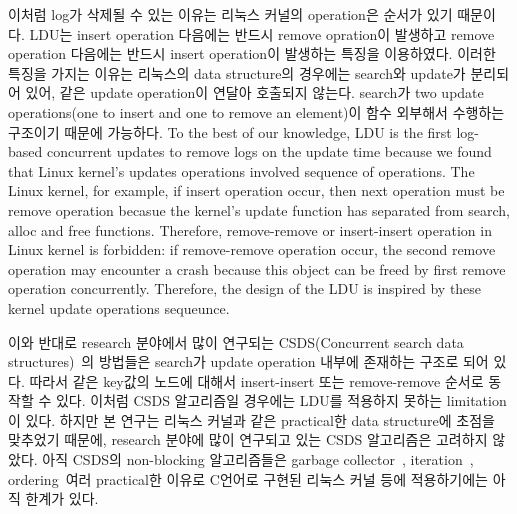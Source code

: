 \ifkor
이처럼 log가 삭제될 수 있는 이유는 리눅스 커널의 operation은 순서가
있기 때문이다.
LDU는 insert operation 다음에는 반드시 remove opration이 발생하고 remove operation 다음에는 반드시
insert operation이 발생하는 특징을 이용하였다.
이러한 특징을 가지는 이유는 리눅스의 data structure의 경우에는 search와 update가 분리되어 있어, 같은 update
operation이 연달아 호출되지 않는다.
search가 two update operations(one to insert and one to remove an element)이 함수
외부해서 수행하는 구조이기 때문에 가능하다.
\else
To the best of our knowledge, LDU is the first log-based concurrent updates to
remove logs on the update time because we found that Linux kernel's updates
operations involved sequence of operations.
The Linux kernel, for example, if insert operation occur, then next operation
must be remove operation becasue the kernel's update function has separated
from search, alloc and free functions.
Therefore, remove-remove or insert-insert operation in Linux kernel is
forbidden: if remove-remove operation occur, the second remove operation may
encounter a crash because this object can be freed by first remove
operation concurrently.
Therefore, the design of the LDU is inspired by these kernel update operations
sequeunce.
\fi


\ifkorthesis
이와 반대로 research 분야에서 많이 연구되는 CSDS(Concurrent search data
structures)~\cite{David2015ASYNCHRONIZED}의 방법들은 search가 update operation 내부에
존재하는 구조로 되어 있다.
따라서 같은 key값의 노드에 대해서 insert-insert 또는 remove-remove 순서로 동작할 수 있다.
이처럼 CSDS 알고리즘일 경우에는 LDU를 적용하지 못하는 limitation이 있다.
하지만 본 연구는 리눅스 커널과 같은 practical한 data structure에 초점을 맞추었기 때문에, 
research 분야에 많이 연구되고 있는 CSDS 알고리즘은 고려하지 않았다.
아직 CSDS의 non-blocking 알고리즘들은 garbage collector~\cite{AlBahra2013NAS},
iteration~\cite{petrank2013lock}, ordering~\cite{zhang2013practical}여러
practical한 이유로 C언어로 구현된 리눅스 커널 등에 적용하기에는 아직 한계가 있다.
\fi


